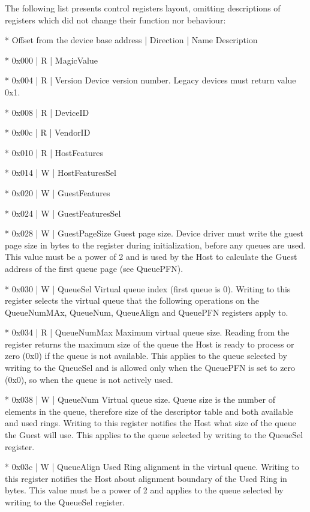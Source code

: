 The following list presents control registers layout, omitting
descriptions of registers which did not change their function
nor behaviour:

* Offset from the device base address | Direction | Name
  Description

* 0x000 | R | MagicValue

* 0x004 | R | Version
  Device version number. Legacy devices must return value 0x1.

* 0x008 | R | DeviceID

* 0x00c | R | VendorID

* 0x010 | R | HostFeatures

* 0x014 | W | HostFeaturesSel

* 0x020 | W | GuestFeatures

* 0x024 | W | GuestFeaturesSel

* 0x028 | W | GuestPageSize
  Guest page size.
  Device driver must write the guest page size in bytes to the
  register during initialization, before any queues are used.
  This value must be a power of 2 and is used by the Host to
  calculate the Guest address of the first queue page
  (see QueuePFN).

* 0x030 | W | QueueSel
  Virtual queue index (first queue is 0).
  Writing to this register selects the virtual queue that the
  following operations on the QueueNumMAx, QueueNum, QueueAlign
  and QueuePFN registers apply to.

* 0x034 | R | QueueNumMax
  Maximum virtual queue size.
  Reading from the register returns the maximum size of the queue
  the Host is ready to process or zero (0x0) if the queue is not
  available. This applies to the queue selected by writing to the
  QueueSel and is allowed only when the QueuePFN is set to zero
  (0x0), so when the queue is not actively used.

* 0x038 | W | QueueNum
  Virtual queue size.
  Queue size is the number of elements in the queue, therefore size
  of the descriptor table and both available and used rings.
  Writing to this register notifies the Host what size of the
  queue the Guest will use. This applies to the queue selected by
  writing to the QueueSel register.

* 0x03c | W | QueueAlign
  Used Ring alignment in the virtual queue.
  Writing to this register notifies the Host about alignment
  boundary of the Used Ring in bytes. This value must be a power
  of 2 and applies to the queue selected by writing to the QueueSel
  register.


